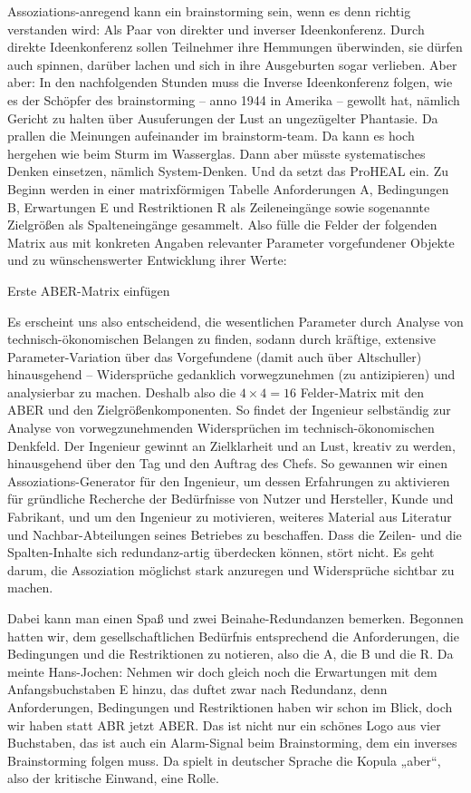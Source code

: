 \documentclass[12pt,a4paper]{article}
\begin{document}
Assoziations-anregend kann ein brainstorming sein, wenn es denn richtig
verstanden wird: Als Paar von direkter und inverser Ideenkonferenz. Durch
direkte Ideenkonferenz sollen Teilnehmer ihre Hemmungen überwinden, sie dürfen
auch spinnen, darüber lachen und sich in ihre Ausgeburten sogar verlieben. Aber
aber: In den nachfolgenden Stunden muss die Inverse Ideenkonferenz folgen, wie
es der Schöpfer des brainstorming – anno 1944 in Amerika -- gewollt hat, nämlich
Gericht zu halten über Ausuferungen der Lust an ungezügelter Phantasie. Da
prallen die Meinungen aufeinander im brainstorm-team. Da kann es hoch hergehen
wie beim Sturm im Wasserglas. Dann aber müsste systematisches Denken einsetzen,
nämlich System-Denken. Und da setzt das ProHEAL ein. Zu Beginn werden in einer
matrixförmigen Tabelle Anforderungen A, Bedingungen B, Erwartungen E und
Restriktionen R als Zeileneingänge sowie sogenannte Zielgrößen als
Spalteneingänge gesammelt. Also fülle die Felder der folgenden Matrix aus mit
konkreten Angaben relevanter Parameter vorgefundener Objekte und zu
wünschenswerter Entwicklung ihrer Werte:
\begin{center}
  Erste ABER-Matrix einfügen
\end{center}

Es erscheint uns also entscheidend, die wesentlichen Parameter durch Analyse
von tech\-nisch-ökonomischen Belangen zu finden, sodann durch kräftige,
extensive Parameter-Variation über das Vorgefundene (damit auch über
Altschuller) hinausgehend – Widersprüche gedanklich vorwegzunehmen (zu
antizipieren) und analysierbar zu machen. Deshalb also die $4\times 4 = 16$
Felder-Matrix mit den ABER und den Zielgrößenkomponenten. So findet der
Ingenieur selbständig zur Analyse von vorwegzunehmenden Widersprüchen im
technisch-ökonomischen Denkfeld. Der Ingenieur gewinnt an Zielklarheit und an
Lust, kreativ zu werden, hinausgehend über den Tag und den Auftrag des
Chefs. So gewannen wir einen Assoziations-Generator für den Ingenieur, um
dessen Erfahrungen zu aktivieren für gründliche Recherche der Bedürfnisse von
Nutzer und Hersteller, Kunde und Fabrikant, und um den Ingenieur zu
motivieren, weiteres Material aus Literatur und Nachbar-Abteilungen seines
Betriebes zu beschaffen. Dass die Zeilen- und die Spalten-Inhalte sich
redundanz-artig überdecken können, stört nicht. Es geht darum, die Assoziation
möglichst stark anzuregen und Widersprüche sichtbar zu machen.

Dabei kann man einen Spaß und zwei Beinahe-Redundanzen bemerken. Begonnen
hatten wir, dem gesellschaftlichen Bedürfnis entsprechend die Anforderungen,
die Bedingungen und die Restriktionen zu notieren, also die A, die B und die R.
Da meinte Hans-Jochen: Nehmen wir doch gleich noch die Erwartungen mit dem
Anfangsbuchstaben E hinzu, das duftet zwar nach Redundanz, denn Anforderungen,
Bedingungen und Restriktionen haben wir schon im Blick, doch wir haben statt
ABR jetzt ABER. Das ist nicht nur ein schönes Logo aus vier Buchstaben, das ist
auch ein Alarm-Signal beim Brainstorming, dem ein inverses Brainstorming folgen
muss. Da spielt in deutscher Sprache die Kopula „aber“, also der kritische
Einwand, eine Rolle.
\end{document}
